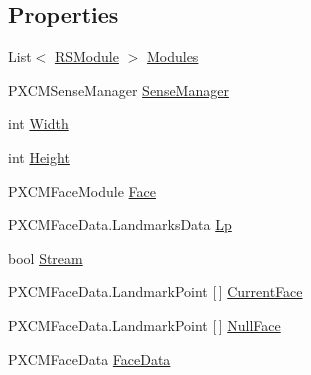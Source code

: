 \subsection*{Properties}
\begin{DoxyCompactItemize}
\item 
List$<$ \hyperlink{class_real_sense_1_1_r_s_module}{R\+S\+Module} $>$ \hyperlink{class_real_sense_1_1_model_a9664e53331481e9cc45ad6d3540c218c}{Modules}
\item 
P\+X\+C\+M\+Sense\+Manager \hyperlink{class_real_sense_1_1_model_a396ec458576859184ac7e39d9be13465}{Sense\+Manager}
\item 
int \hyperlink{class_real_sense_1_1_model_a20e2b5bc79da762b436b75ddd28f63b7}{Width}
\item 
int \hyperlink{class_real_sense_1_1_model_abf6324c9f4acc3134909a239eff37a0a}{Height}
\item 
P\+X\+C\+M\+Face\+Module \hyperlink{class_real_sense_1_1_model_abb8701f1030ca1e3bfd226a9ad352da5}{Face}
\item 
P\+X\+C\+M\+Face\+Data.\+Landmarks\+Data \hyperlink{class_real_sense_1_1_model_a3e349d000d00015a340954ec3be977ea}{Lp}
\item 
bool \hyperlink{class_real_sense_1_1_model_a77ed4a52eb836db3c890cb0844014ac1}{Stream}
\item 
P\+X\+C\+M\+Face\+Data.\+Landmark\+Point \mbox{[}$\,$\mbox{]} \hyperlink{class_real_sense_1_1_model_ad90fab8a6125b55803734ebbdcf1f83d}{Current\+Face}
\item 
P\+X\+C\+M\+Face\+Data.\+Landmark\+Point \mbox{[}$\,$\mbox{]} \hyperlink{class_real_sense_1_1_model_af626df64a18cb2fcf4cbc06ffbadfa17}{Null\+Face}
\item 
P\+X\+C\+M\+Face\+Data \hyperlink{class_real_sense_1_1_model_a0d16c2536a9f3c346cc3d51b3227989e}{Face\+Data}

\end{DoxyCompactItemize}
